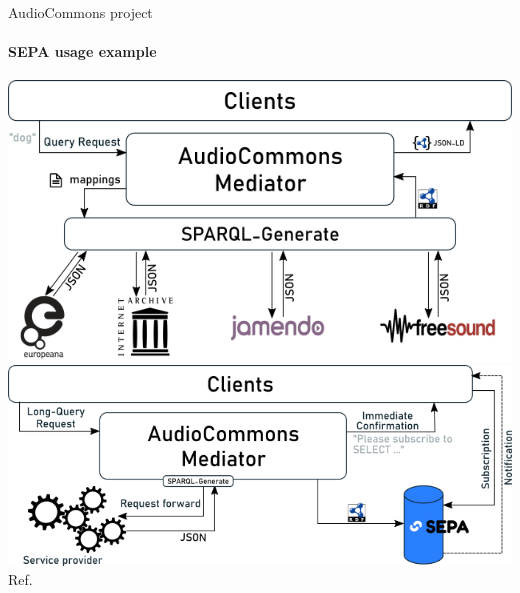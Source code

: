 \documentclass{beamer}
\begin{document}
\begin{frame}[allowframebreaks]{AudioCommons project}
\framesubtitle{SEPA usage example}
\includegraphics[width=\textwidth]{audiocommons_schema.png}
\includegraphics[width=\textwidth]{audiocommons_schema_sepa.png}
Ref. \cite{ceriani2018audio, xambo2018jam, lefranccois2017sparql}
\end{frame}
\end{document}
